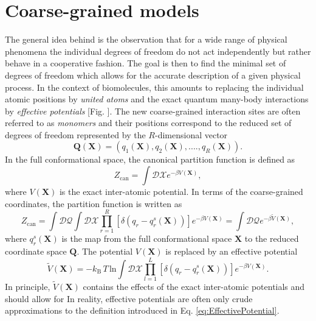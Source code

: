 \documentclass[12pt]{report}
\begin{document}
\section{Coarse-grained models}
The general idea behind  is the observation that for a wide range of physical phenomena the individual degrees of freedom do not act independently but rather behave in a cooperative fashion. The goal is then to find the minimal set of degrees of freedom which allows for the accurate description of a given physical process. In the context of biomolecules, this amounts to replacing the individual atomic positions by \textit{united atoms} and the exact quantum many-body interactions by \textit{effective potentials} [Fig. ]. The new coarse-grained interaction sites are often referred to as \textit{monomers} and their positions correspond to the reduced set of degrees of freedom represented by the $R$-dimensional vector
%
\begin{equation}
\mathbf{Q(X)} = (q_{1}(\mathbf{X}),q_{2}(\mathbf{X}),....,q_{R}(\mathbf{X})).
\end{equation}
%
In the full conformational space, the canonical partition function is defined as
%
\begin{equation}
Z_{\mathrm{can}} = \int \mathcal{DX}e^{-\beta V(\mathbf{X})},
\end{equation}
%
where $V(\mathbf{X})$ is the exact inter-atomic potential. In terms of the coarse-grained coordinates, the partition function is written as
%
\begin{equation}
Z_{\mathrm{can}} = \int \mathcal{DQ}\int \mathcal{DX}\prod _{r = 1}^{R} \left[\delta (q_{r} - q_{r}^{s}(\mathbf{X}))\right]e^{-\beta V(\mathbf{X})} = \int \mathcal{DQ}e^{-\beta \tilde{V}(\mathbf{X})},
\end{equation}
where $q_{r}^{s}(\mathbf{X})$ is the map from the full conformational space $\mathbf{X}$ to the reduced coordinate space $\mathbf{Q}$. The potential $V(\mathbf{X})$ is replaced by an effective potential
%
\begin{equation}
\label{eq:EffectivePotential}
\tilde{V}(\mathbf{X}) = -k_{\mathrm{B}}\,T\,\mathrm{ln} \int \mathcal{DX}\prod_{l = 1}^{L} \left[\delta (q_{r} - q_{r}^{s}(\mathbf{X}))\right]e^{-\beta V(\mathbf{X})}.
\end{equation}
%
In principle, $\tilde{V}(\mathbf{X})$ contains the effects of the exact inter-atomic potentials and should allow for 
In reality, effective potentials are often only crude approximations to the definition introduced in Eq. \ref{eq:EffectivePotential}. 
\end{document}
